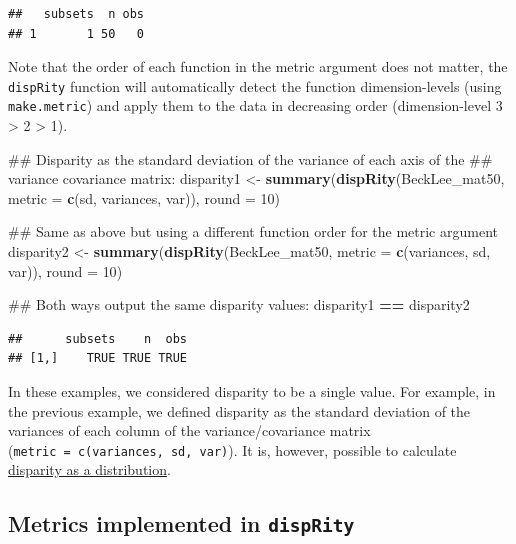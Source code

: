 \documentclass[]{book}
\newenvironment{Shaded}{\begin{snugshade}}{\end{snugshade}}
\newcommand{\KeywordTok}[1]{\textcolor[rgb]{0.13,0.29,0.53}{\textbf{#1}}}
\newcommand{\DataTypeTok}[1]{\textcolor[rgb]{0.13,0.29,0.53}{#1}}
\newcommand{\DecValTok}[1]{\textcolor[rgb]{0.00,0.00,0.81}{#1}}
\newcommand{\StringTok}[1]{\textcolor[rgb]{0.31,0.60,0.02}{#1}}
\newcommand{\OperatorTok}[1]{\textcolor[rgb]{0.81,0.36,0.00}{\textbf{#1}}}
\newcommand{\NormalTok}[1]{#1}
\theoremstyle{definition}
\theoremstyle{definition}
\theoremstyle{definition}
\theoremstyle{remark}
\begin{document}
\begin{verbatim}
##   subsets  n obs
## 1       1 50   0
\end{verbatim}

Note that the order of each function in the metric argument does not
matter, the \texttt{dispRity} function will automatically detect the
function dimension-levels (using \texttt{make.metric}) and apply them to
the data in decreasing order (dimension-level 3 \textgreater{} 2
\textgreater{} 1).

\begin{Shaded}
\begin{Highlighting}[]
\NormalTok{## Disparity as the standard deviation of the variance of each axis of the}
\NormalTok{## variance covariance matrix:}
\NormalTok{disparity1 <-}\StringTok{ }\KeywordTok{summary}\NormalTok{(}\KeywordTok{dispRity}\NormalTok{(BeckLee_mat50, }\DataTypeTok{metric =} \KeywordTok{c}\NormalTok{(sd, variances, var)),}
                      \DataTypeTok{round =} \DecValTok{10}\NormalTok{)}

\NormalTok{## Same as above but using a different function order for the metric argument}
\NormalTok{disparity2 <-}\StringTok{ }\KeywordTok{summary}\NormalTok{(}\KeywordTok{dispRity}\NormalTok{(BeckLee_mat50, }\DataTypeTok{metric =} \KeywordTok{c}\NormalTok{(variances, sd, var)),}
                      \DataTypeTok{round =} \DecValTok{10}\NormalTok{)}

\NormalTok{## Both ways output the same disparity values:}
\NormalTok{disparity1 }\OperatorTok{==}\StringTok{ }\NormalTok{disparity2}
\end{Highlighting}
\end{Shaded}

\begin{verbatim}
##      subsets    n  obs
## [1,]    TRUE TRUE TRUE
\end{verbatim}

In these examples, we considered disparity to be a single value. For
example, in the previous example, we defined disparity as the standard
deviation of the variances of each column of the variance/covariance
matrix (\texttt{metric\ =\ c(variances,\ sd,\ var)}). It is, however,
possible to calculate
\protect\hyperlink{disparity-as-a-distribution}{disparity as a
distribution}.

\subsection{\texorpdfstring{Metrics implemented in
\texttt{dispRity}}{Metrics implemented in dispRity}}\label{metrics-implemented-in-disprity}
\end{document}
